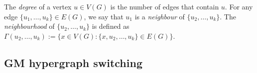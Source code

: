 \documentclass[12pt]{article}
\numberwithin{equation}{section}
\theoremstyle{definition}
\newcommand{\ev}[1]{( #1 )}
\begin{document}
The \emph{degree} of a vertex $u\in V(G)$ is the number of edges that contain $u$. For any edge $\{ u_1,\ldots, u_k\} \in E\ev{G}$, we say that $u_1$ is a \textit{neighbour} of $\{ u_2,\ldots, u_k\}$. The \textit{neighbourhood} of $\{ u_2,\ldots, u_k\}$ is defined as $\Gamma(u_2,\ldots, u_k):= \{ x\in V\ev{G}: \{x,u_2,\ldots, u_k \} \in E\ev{G}\}$.
\subsection{GM hypergraph switching}
\end{document}
